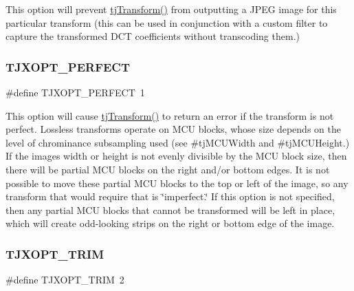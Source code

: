 This option will prevent \hyperlink{group___turbo_j_p_e_g_gae403193ceb4aafb7e0f56ab587b48616}{tj\+Transform()} from outputting a J\+P\+EG image for this particular transform (this can be used in conjunction with a custom filter to capture the transformed D\+CT coefficients without transcoding them.) \mbox{\label{group___turbo_j_p_e_g_ga50e03cb5ed115330e212417429600b00}} 
\subsubsection{\texorpdfstring{T\+J\+X\+O\+P\+T\+\_\+\+P\+E\+R\+F\+E\+CT}{TJXOPT\_PERFECT}}
{\footnotesize\ttfamily \#define T\+J\+X\+O\+P\+T\+\_\+\+P\+E\+R\+F\+E\+CT~1}

This option will cause \hyperlink{group___turbo_j_p_e_g_gae403193ceb4aafb7e0f56ab587b48616}{tj\+Transform()} to return an error if the transform is not perfect. Lossless transforms operate on M\+CU blocks, whose size depends on the level of chrominance subsampling used (see \#tj\+M\+C\+U\+Width and \#tj\+M\+C\+U\+Height.) If the image\textquotesingle{}s width or height is not evenly divisible by the M\+CU block size, then there will be partial M\+CU blocks on the right and/or bottom edges. It is not possible to move these partial M\+CU blocks to the top or left of the image, so any transform that would require that is \char`\"{}imperfect.\char`\"{} If this option is not specified, then any partial M\+CU blocks that cannot be transformed will be left in place, which will create odd-\/looking strips on the right or bottom edge of the image. \mbox{\label{group___turbo_j_p_e_g_ga319826b7eb1583c0595bbe7b95428709}} 
\subsubsection{\texorpdfstring{T\+J\+X\+O\+P\+T\+\_\+\+T\+R\+IM}{TJXOPT\_TRIM}}
{\footnotesize\ttfamily \#define T\+J\+X\+O\+P\+T\+\_\+\+T\+R\+IM~2}

